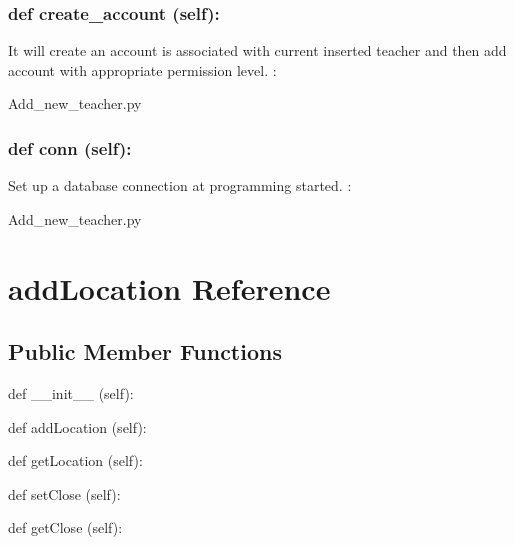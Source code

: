 \hypertarget{class_poly_a14a7ad77ce612b0c54f531d307ee4b39}{
\subsubsection[{def create_account(self):}]{\setlength{\rightskip}{0pt plus 5cm}def {create\_account} (self):}}\label{class_poly_a14a7ad77ce612b0c54f531d307ee4b39}
It will create an account is associated with current inserted teacher and then add account with appropriate permission level.
:\begin{DoxyCompactItemize}
\item 
Add\_new\_teacher.\-py\end{DoxyCompactItemize}

\hypertarget{class_poly_a14a7ad77ce612b0c54f531d307ee4b39}{
\subsubsection[{def conn(self):}]{\setlength{\rightskip}{0pt plus 5cm}def {conn} (self):}}\label{class_poly_a14a7ad77ce612b0c54f531d307ee4b39}
Set up a database connection at programming started.
:\begin{DoxyCompactItemize}
\item 
Add\_new\_teacher.\-py\end{DoxyCompactItemize}



\hypertarget{addLocation}{\section{addLocation Reference}
\label{addLocation}
}
\subsection*{Public Member Functions}
\begin{DoxyCompactItemize}
\item 
def {\_\_init\_\_} (self):
\item 
def {addLocation} (self):
\item 
def {getLocation} (self):
\item 
def {setClose} (self):
\item 
def {getClose} (self):

\end{DoxyCompactItemize}

